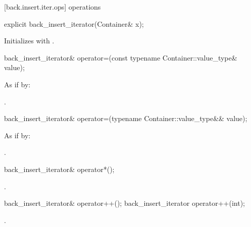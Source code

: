 [back.insert.iter.ops]{ operations}

%
\begin{itemdecl}
explicit back_insert_iterator(Container& x);
\end{itemdecl}

\begin{itemdescr}
\pnum
\effects
Initializes
with .
\end{itemdescr}

%
\begin{itemdecl}
back_insert_iterator& operator=(const typename Container::value_type& value);
\end{itemdecl}

\begin{itemdescr}
\pnum
\effects
As if by: 

\pnum
\returns
{}.
\end{itemdescr}

%
\begin{itemdecl}
back_insert_iterator& operator=(typename Container::value_type&& value);
\end{itemdecl}

\begin{itemdescr}
\pnum
\effects
As if by: 

\pnum
\returns
{}.
\end{itemdescr}

%
\begin{itemdecl}
back_insert_iterator& operator*();
\end{itemdecl}

\begin{itemdescr}
\pnum
\returns
{}.
\end{itemdescr}

%
\begin{itemdecl}
back_insert_iterator& operator++();
back_insert_iterator  operator++(int);
\end{itemdecl}

\begin{itemdescr}
\pnum
\returns
{}.
\end{itemdescr}

